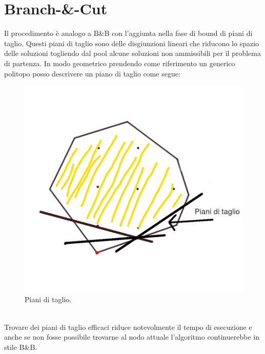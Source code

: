 \documentclass[12pt,a4paper,twoside,openright]{book}
\begin{document}
\section{Branch-\&-Cut}
Il procedimento è analogo a B\&B con l’aggiunta nella fase di bound di piani di taglio. Questi
piani di taglio sono delle disgiunzioni lineari che riducono lo spazio delle soluzioni
togliendo dal pool alcune soluzioni non ammissibili per il problema di partenza. In modo
geometrico prendendo come riferimento un generico politopo posso descrivere un piano di
taglio come segue:\\
\begin{figure}[ht]
    \centering
    \includegraphics [scale = 0.7]{cutting_planes.png}
    \caption{Piani di taglio. }
    \label{fig:cuts}
\end{figure}\\
Trovare dei piani di taglio efficaci riduce notevolmente il tempo di esecuzione e anche se non fosse 
possibile trovarne al nodo attuale l'algoritmo continuerebbe in stile B\&B.
\end{document}
